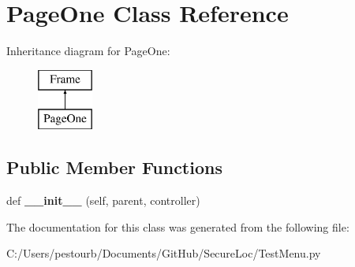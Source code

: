 \hypertarget{class_test_menu_1_1_page_one}{}\section{Page\+One Class Reference}
\label{class_test_menu_1_1_page_one}
Inheritance diagram for Page\+One\+:\begin{figure}[H]
\begin{center}
\leavevmode
\includegraphics[height=2.000000cm]{class_test_menu_1_1_page_one}
\end{center}
\end{figure}
\subsection*{Public Member Functions}
\begin{DoxyCompactItemize}
\item 
\mbox{\label{class_test_menu_1_1_page_one_a558d9afc290e8d1ff922f46114f16631}} 
def {\bfseries \+\_\+\+\_\+init\+\_\+\+\_\+} (self, parent, controller)
\end{DoxyCompactItemize}


The documentation for this class was generated from the following file\+:\begin{DoxyCompactItemize}
\item 
C\+:/\+Users/pestourb/\+Documents/\+Git\+Hub/\+Secure\+Loc/Test\+Menu.\+py\end{DoxyCompactItemize}
